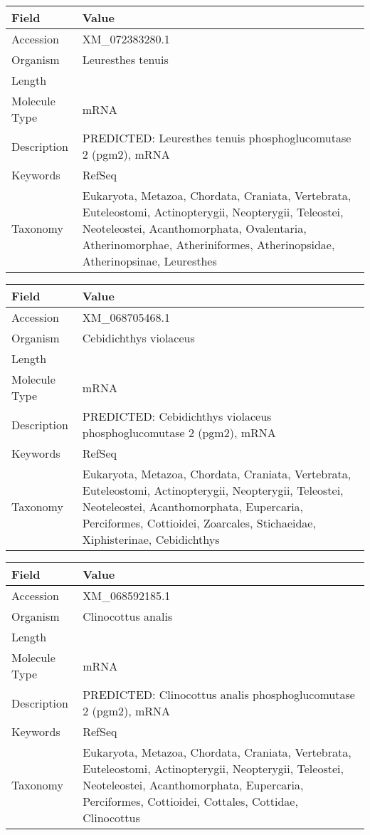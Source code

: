 \documentclass[10pt]{article}
\begin{document}
\vspace{1em}
{\footnotesize
\begin{longtable}{>{\raggedright\arraybackslash}p{4.5cm} >{\raggedright\arraybackslash}p{11.5cm}}
\textbf{Field} & \textbf{Value} \\
\hline
Accession & XM\_072383280.1 \\
Organism & Leuresthes tenuis \\
Length & 2902 \\
Molecule Type & mRNA \\
Description & PREDICTED: Leuresthes tenuis phosphoglucomutase 2 (pgm2), mRNA \\
Keywords & RefSeq \\
Taxonomy & Eukaryota, Metazoa, Chordata, Craniata, Vertebrata, Euteleostomi, Actinopterygii, Neopterygii, Teleostei, Neoteleostei, Acanthomorphata, Ovalentaria, Atherinomorphae, Atheriniformes, Atherinopsidae, Atherinopsinae, Leuresthes \\
\end{longtable}
}

\vspace{1em}
{\footnotesize
\begin{longtable}{>{\raggedright\arraybackslash}p{4.5cm} >{\raggedright\arraybackslash}p{11.5cm}}
\textbf{Field} & \textbf{Value} \\
\hline
Accession & XM\_068705468.1 \\
Organism & Cebidichthys violaceus \\
Length & 2487 \\
Molecule Type & mRNA \\
Description & PREDICTED: Cebidichthys violaceus phosphoglucomutase 2 (pgm2), mRNA \\
Keywords & RefSeq \\
Taxonomy & Eukaryota, Metazoa, Chordata, Craniata, Vertebrata, Euteleostomi, Actinopterygii, Neopterygii, Teleostei, Neoteleostei, Acanthomorphata, Eupercaria, Perciformes, Cottioidei, Zoarcales, Stichaeidae, Xiphisterinae, Cebidichthys \\
\end{longtable}
}

\vspace{1em}
{\footnotesize
\begin{longtable}{>{\raggedright\arraybackslash}p{4.5cm} >{\raggedright\arraybackslash}p{11.5cm}}
\textbf{Field} & \textbf{Value} \\
\hline
Accession & XM\_068592185.1 \\
Organism & Clinocottus analis \\
Length & 2173 \\
Molecule Type & mRNA \\
Description & PREDICTED: Clinocottus analis phosphoglucomutase 2 (pgm2), mRNA \\
Keywords & RefSeq \\
Taxonomy & Eukaryota, Metazoa, Chordata, Craniata, Vertebrata, Euteleostomi, Actinopterygii, Neopterygii, Teleostei, Neoteleostei, Acanthomorphata, Eupercaria, Perciformes, Cottioidei, Cottales, Cottidae, Clinocottus \\
\end{longtable}
}
\end{document}
